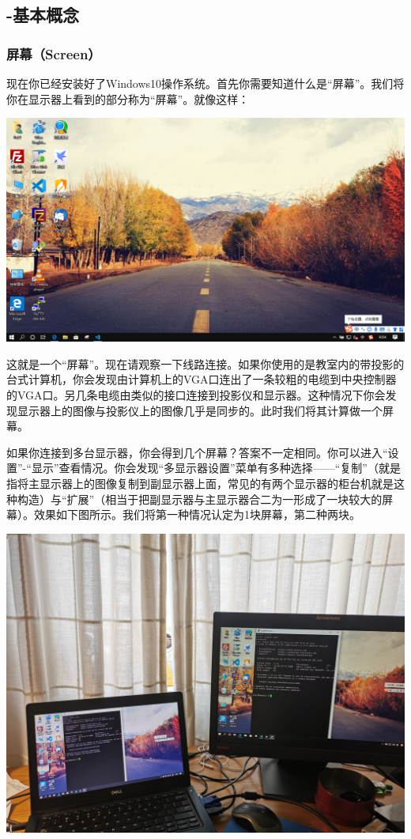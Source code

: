 \subsection{-基本概念}
\subsubsection{屏幕（Screen）}
现在你已经安装好了Windows10操作系统。首先你需要知道什么是“屏幕”。我们将你在显示器上看到的部分称为“屏幕”。就像这样：
\begin{center}
	\includegraphics[scale=0.3]{pic/screen}
\end{center} \par
这就是一个“屏幕”。现在请观察一下线路连接。如果你使用的是教室内的带投影的台式计算机，你会发现由计算机上的VGA口连出了一条较粗的电缆到中央控制器的VGA口。另几条电缆由类似的接口连接到投影仪和显示器。这种情况下你会发现显示器上的图像与投影仪上的图像几乎是同步的。此时我们将其计算做一个屏幕。\par
如果你连接到多台显示器，你会得到几个屏幕？答案不一定相同。你可以进入“设置”-“显示”查看情况。你会发现“多显示器设置”菜单有多种选择——“复制”（就是指将主显示器上的图像复制到副显示器上面，常见的有两个显示器的柜台机就是这种构造）与“扩展”（相当于把副显示器与主显示器合二为一形成了一块较大的屏幕）。效果如下图所示。我们将第一种情况认定为1块屏幕，第二种两块。
\begin{center}
	\includegraphics[scale=0.1]{pic/ScrCopy}
\end{center} 
